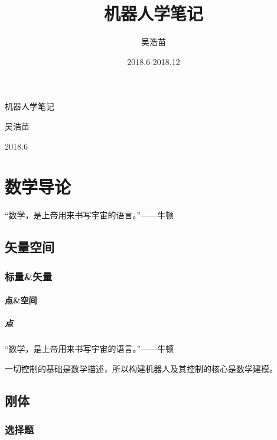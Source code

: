 \documentclass[a4paper,zihao=5,openany,oneside,sub4section]{ctexbook}
\begin{document}
\title{机器人学笔记}
\author{吴浩苗}
\date{2018.6-2018.12}

\frontmatter
\thispagestyle{empty} %
\begin{titlepage}
	\centering
	\begin{center}
		\vspace*{6cm}
		{\par \Huge {\heiti 机器人学笔记 } }
		\vspace{1cm}
		{\par \LARGE {\lishu  吴浩苗} }
		\vspace{12cm}
        {\par \large 2018.6}
	\end{center}
\end{titlepage}
\afterpage{\nopagecolor}

\setcounter{page}{1}
\tableofcontents			%

\mainmatter %

\setcounter{page}{1}
\part{数学导论}
\cleardoublepage
“数学，是上帝用来书写宇宙的语言。”——牛顿
	\chapter{矢量空间}
		\section{标量\&矢量}
            \subsection{点\&空间}
                \subsubsection{点}
“数学，是上帝用来书写宇宙的语言。”——牛顿
{\par 一切控制的基础是数学描述，所以构建机器人及其控制的核心是数学建模。}
	\chapter{刚体}
		\section{选择题}
\end{document}
